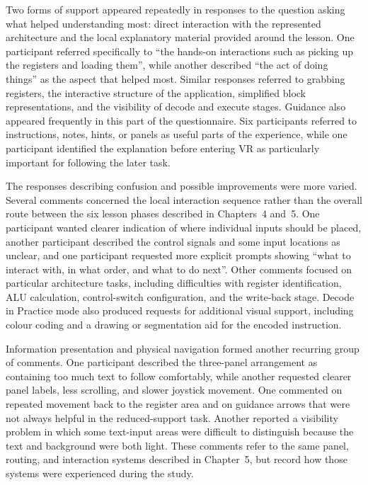 Two forms of support appeared repeatedly in responses to the question asking what helped understanding most: direct interaction with the represented architecture and the local explanatory material provided around the lesson. One participant referred specifically to ``the hands-on interactions such as picking up the registers and loading them'', while another described ``the act of doing things'' as the aspect that helped most. Similar responses referred to grabbing registers, the interactive structure of the application, simplified block representations, and the visibility of decode and execute stages. Guidance also appeared frequently in this part of the questionnaire. Six participants referred to instructions, notes, hints, or panels as useful parts of the experience, while one participant identified the explanation before entering VR as particularly important for following the later task.

The responses describing confusion and possible improvements were more varied. Several comments concerned the local interaction sequence rather than the overall route between the six lesson phases described in Chapters~4 and~5. One participant wanted clearer indication of where individual inputs should be placed, another participant described the control signals and some input locations as unclear, and one participant requested more explicit prompts showing ``what to interact with, in what order, and what to do next''. Other comments focused on particular architecture tasks, including difficulties with register identification, ALU calculation, control-switch configuration, and the write-back stage. Decode in Practice mode also produced requests for additional visual support, including colour coding and a drawing or segmentation aid for the encoded instruction.

Information presentation and physical navigation formed another recurring group of comments. One participant described the three-panel arrangement as containing too much text to follow comfortably, while another requested clearer panel labels, less scrolling, and slower joystick movement. One commented on repeated movement back to the register area and on guidance arrows that were not always helpful in the reduced-support task. Another reported a visibility problem in which some text-input areas were difficult to distinguish because the text and background were both light. These comments refer to the same panel, routing, and interaction systems described in Chapter~5, but record how those systems were experienced during the study.

